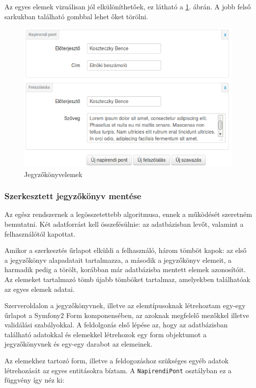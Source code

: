 \documentclass[a4paper,12pt,oneside]{report}
\begin{document}
Az egyes elemek vizuálisan jól elkülöníthetőek, ez látható a \ref{fig:jegyzokonyv_szerkesztes}. ábrán. A jobb felső sarkukban található gombbal lehet őket törölni.

\begin{figure}[h]
    \centering
    \includegraphics[width=\textwidth]{jegyzokonyv_szerkesztes.png}
    \caption{Jegyzőkönyvelemek}
    \label{fig:jegyzokonyv_szerkesztes}
\end{figure}

\subsubsection*{Szerkesztett jegyzőkönyv mentése}

Az egész rendszernek a legösszetettebb algoritmusa, ennek a működését szeretném bemutatni. Két adatforrást kell összefésülnie: az adatbázisban levőt, valamint a felhasználótól kapottat.

Amikor a szerkesztés űrlapot elküldi a felhasználó, három tömböt kapok: az első a jegyzőkönyv alapadatait tartalmazza, a második a jegyzőkönyv elemeit, a harmadik pedig a törölt, korábban már adatbázisba mentett elemek azonosítóit. Az elemeket tartalmazó tömb újabb tömböket tartalmaz, amelyekben találhatóak az egyes elemek adatai.

Szerveroldalon a jegyzőkönyvnek, illetve az elemtípusoknak létrehoztam egy-egy űrlapot a Symfony2 Form komponensében, az azoknak megfelelő mezőkkel illetve validálási szabályokkal. A feldolgozás első lépése az, hogy az adatbázisban található adatokkal és elemekkel létrehozok egy form objektumot a jegyzőkönyvnek és egy-egy darabot az elemeinek.

Az elemekhez tartozó form, illetve a feldogozáshoz szükséges egyéb adatok létrehozását az egyes entitásokra bíztam. A {\tt NapirendiPont} osztályban ez a függvény így néz ki:
\end{document}
